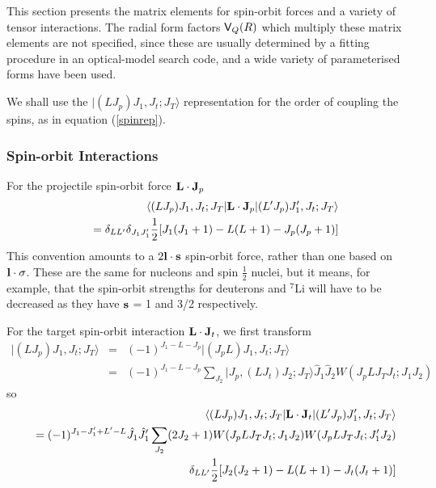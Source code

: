 \documentclass[11pt,a4paper]{article}
\newcommand{\vecl}{{\bf l}}
\newcommand{\vecs}{{\bf s}}
\newcommand{\Vee}{{\sf V}}
\newcommand{\half}{\frac{1}{2}}
\begin{document}
This section presents the matrix elements for spin-orbit forces and a
variety of tensor interactions.  The radial form factors
$\Vee_Q (R)$ which multiply these matrix elements are not
specified, since these are usually determined by a fitting procedure
in an optical-model search code, and a wide variety of
parameterised forms have been used.

We shall use the $ | (LJ_p) J_1 ,J_t ;J_T\rangle $ representation
for the order of coupling the spins, as in equation (\ref{spinrep}).
\subsubsection{Spin-orbit Interactions}

For the projectile spin-orbit force $ {\bf L\cdot J}_p $
\begin{eqnarray}\nonumber
&&\left\langle (L \Jp ) J_1 , \Jt ; \JT | {\bf L\cdot J}_p
                             | ( \Lq \Jp ) J'_1 , \Jt ; \JT \right\rangle
\\
&&= \delta_{L \Lq } \delta_{ J_1  J'_1 }
    \half [ J_1 ( J_1 +1) - L(L+1) - \Jp ( \Jp + 1) ]
\end{eqnarray}
This convention amounts to a $ 2 \vecl \cdot \vecs $ spin-orbit force, rather
than one based on $ \vecl \cdot {\bf \sigma}$. These are the same for nucleons
and spin $\half$ nuclei, but it means, for example, that the
spin-orbit strengths for deuterons and $^7$Li will
have to be decreased as they have $ \vecs$ = 1 and 3/2 respectively.

For the target spin-orbit interaction $ {\bf L\cdot J}_t$, we first transform
\begin{eqnarray} \nonumber
 | (LJ_p) J_1 ,J_t ;J_T\rangle &=& (-1)^{J_1 - L - J_p }
                                    | (J_p L) J_1 ,J_t ;J_T\rangle
\\
 &  =& (-1)^{J_1 - L - J_p } \sum _ {J_2}
 | J_p , (LJ_t ) J_2 ; J_T\rangle \hat J_1 \hat J_2
  W( J_p L J_T J_t ; J_1 J_2 )
\end{eqnarray}
so
\begin{eqnarray*} \nonumber
&&\left\langle (L J_p ) J_1 , J_t ; J_T | {\bf L\cdot J}_t
                             | ( L' J_p ) J'_1 , J_t ; J_T \right\rangle\\
 &&= (-1)^{J_1 - J'_1 + L' - L} \hat J_1 \hat J'_1
  \sum _ {J_2} (2 J_2 + 1)  W( J_p L J_T J_t ; J_1 J_2 )
                           W( J_p L J_T J_t ; J'_1 J_2 )
\\
 && \delta_{L L' }\half [ J_2 ( J_2 +1) - L(L+1) - J_t ( J_t + 1) ]
\end{eqnarray*}
\end{document}
